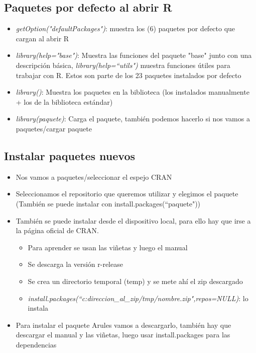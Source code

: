 \documentclass[a4paper, 12pt]{article}
\begin{document}
    \subsection{Paquetes por defecto al abrir R}
        \begin{itemize}
            \item \emph{getOption("defaultPackages")}: muestra los (6) paquetes por defecto que cargan al abrir R
            \item \emph{library(help="base")}: Muestra las funciones del paquete "base" junto con una descripción básica, \emph{library(help=\textquotedblleft utils")} muestra funciones útiles para trabajar con R. Estos son parte de los 23 paquetes instalados por defecto
            \item \emph{library()}: Muestra los paquetes en la biblioteca (los instalados manualmente + los de la biblioteca estándar)
            \item \emph{library(paquete)}: Carga el paquete, también podemos hacerlo si nos vamos a paquetes/cargar paquete
        \end{itemize}
    \subsection{Instalar paquetes nuevos}
        \begin{itemize}
            \item Nos vamos a paquetes/seleccionar el espejo CRAN
            \item Seleccionamos el repositorio que queremos utilizar y elegimos el paquete (También se puede instalar con install.packages(\textquotedblleft paquete"))
            \item También se puede instalar desde el dispositivo local, para ello hay que irse a la página oficial de CRAN.
                \begin{itemize}
                    \item Para aprender se usan las viñetas y luego el manual
                    \item Se descarga la versión r-release
                    \item Se crea un directorio temporal (temp) y se mete ahí el zip descargado
                    \item \emph{install.packages(\textquotedblleft c:direccion\_al\_zip/tmp/nombre.zip",repos=NULL)}: lo instala
                \end{itemize} 
            \item Para instalar el paquete Arules vamos a descargarlo, también hay que descargar el manual y las viñetas, luego usar install.packages para las dependencias
        \end{itemize}
    
\end{document}
